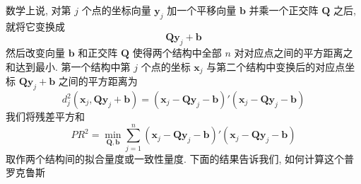 数学上说, 对第 $j$ 个点的坐标向量 $\mathbf{y}_{j}$ 加一个平移向量 $\mathbf{b}$ 并乘一个正交阵 $\mathbf{Q}$ 之后, 就将它变换成
\[
\mathbf{Q}\mathbf{y}_{j}+\mathbf{b}
\]
然后改变向量 $\mathbf{b}$ 和正交阵 $\mathbf{Q}$ 使得两个结构中全部 $n$ 对对应点之间的平方距离之和达到最小. 第一个结构中第 $j$ 个点的坐标 $\mathbf{x}_{j}$ 与第二个结构中变换后的对应点坐标 $\mathbf{Q}\mathbf{y}_{j}+\mathbf{b}$ 之间的平方距离为
\label{eq:12-48}
\begin{equation}
d_{j}^{2}(\mathbf{x}_{j},\mathbf{Q}\mathbf{y}_{j}+\mathbf{b})=(\mathbf{x}_{j}-\mathbf{Q}\mathbf{y}_{j}-\mathbf{b})'(\mathbf{x}_{j}-\mathbf{Q}\mathbf{y}_{j}-\mathbf{b}) \tag{12-48}
\end{equation}
我们将残差平方和
\label{eq:12-49}
\begin{equation}
PR^{2}=\min_{\mathbf{Q},\mathbf{b}}\sum_{j=1}^{n}(\mathbf{x}_{j}-\mathbf{Q}\mathbf{y}_{j}-\mathbf{b})'(\mathbf{x}_{j}-\mathbf{Q}\mathbf{y}_{j}-\mathbf{b}) \tag{12-49}
\end{equation}
取作两个结构间的拟合量度或一致性量度. 下面的结果告诉我们, 如何计算这个普罗克鲁斯
